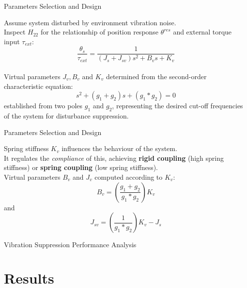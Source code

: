 \documentclass[10pt]{beamer}
\begin{document}
\begin{frame}{Parameters Selection and Design}

Assume system disturbed by environment vibration noise.\\
\bigskip
Inspect $ H_{22} $ for the relationship of position response $ \theta^{res} $ and external torque input $ \tau_{ext} $:
\begin{equation*}
	\dfrac{\theta_s}{\tau_{ext}} = \dfrac{1}{(J_s + J_{sv}) s^2 + B_v s + K_v}
	\label{H_22}
\end{equation*}\\
\bigskip
Virtual parameters $ J_{v}, B_{v} $ and $ K_{v} $ determined from the second-order characteristic equation:
\begin{equation*}
	s^{2} + (g_{1} + g_{2})s + (g_{1}*g_{2}) = 0
\end{equation*}
established from two poles $ g_{1} $ and $ g_{2} $, representing the desired cut-off frequencies of the system for disturbance suppression.

\end{frame}

\begin{frame}{Parameters Selection and Design}
	
Spring stiffness $ K_{v} $ influences the behaviour of the system.\\
\bigskip
It regulates the \textit{compliance} of this, achieving \textbf{rigid coupling} (high spring stiffness) or \textbf{spring coupling} (low spring stiffness).\\
\bigskip
Virtual parameters $ B_{v} $ and $J_{v} $ computed according to $ K_{v} $:
\begin{equation*}
	B_v = \left(\frac{g_1 + g_2}{g_1*g_2}\right) K_v
\end{equation*}
and
\begin{equation*}
	J_{sv} = \left(\frac{1}{g_1*g_2}\right) K_v - J_s
\end{equation*}

\end{frame}	

\begin{frame}{Vibration Suppression Performance Analysis}
	
	
	
\end{frame}	

\section{Results}
\end{document}
